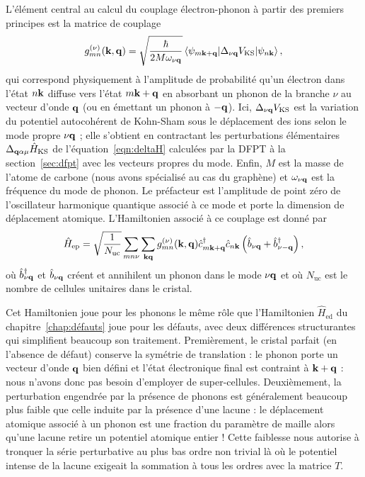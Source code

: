 L'élément central au calcul du couplage électron-phonon à partir des premiers principes est la matrice de couplage~\cite{giustinoElectronphononInteractionUsing2007}
\begin{equation}
    g_{mn}^{(\nu)}(\kv,\qv) = \sqrt{\frac{\hbar}{2M\omega_{\nu\qv}}}\matrixel{\psi_{m\kv+\qv}}{\Delta_{\nu\qv}V_\text{KS}}{\psi_{n\kv}},\label{eqn:g}
\end{equation}
qui correspond physiquement à l'amplitude de probabilité qu'un électron dans l'état $n\mathbf{k}$ diffuse vers l'état $m\mathbf{k}+\mathbf{q}$ en absorbant un phonon de la branche $\nu$ au vecteur d'onde $\mathbf{q}$ (ou en émettant un phonon à $-\mathbf{q}$). Ici, $\Delta_{\nu\mathbf{q}}V_\text{KS}$ est la variation du potentiel autocohérent de Kohn-Sham sous le déplacement des ions selon le mode propre $\nu\mathbf{q}$ ; elle s'obtient en contractant les perturbations élémentaires $\Delta_{\mathbf{q}\alpha\mu}\hat{H}_\text{KS}$ de l'équation~\eqref{eqn:deltaH} calculées par la DFPT à la section~\ref{sec:dfpt} avec les vecteurs propres du mode. Enfin, $M$ est la masse de l'atome de carbone (nous avons spécialisé au cas du graphène) et $\omega_{\nu\mathbf{q}}$ est la fréquence du mode de phonon. Le préfacteur est l'amplitude de point zéro de l'oscillateur harmonique quantique associé à ce mode et porte la dimension de déplacement atomique. L'Hamiltonien associé à ce couplage est donné par~\cite{giustinoElectronphononInteractionsFirst2017,ponceEPWElectronphononCoupling2016}
\begin{equation}
    \hat{H}_\text{ep}=\sqrt{\frac{1}{N_\text{uc}}}\sum_{mn\nu}\sum_{\mathbf{k}\mathbf{q}}g_{mn}^{(\nu)}(\mathbf{k},\mathbf{q})\hat{c}^\dag_{m\mathbf{k}+\mathbf{q}}\hat{c}_{n\mathbf{k}}\left(\hat{b}_{\nu\mathbf{q}}+\hat{b}^\dag_{\nu-\mathbf{q}}\right),\label{eqn:H_ep}
\end{equation}
où $\hat{b}^\dag_{\nu\mathbf{q}}$ et $\hat{b}_{\nu\mathbf{q}}$ créent et annihilent un phonon dans le mode $\nu\mathbf{q}$ et où $N_\text{uc}$ est le nombre de cellules unitaires dans le cristal.

Cet Hamiltonien joue pour les phonons le même rôle que l'Hamiltonien $\hat{H}_\text{ed}$ du chapitre~\ref{chap:défauts} joue pour les défauts, avec deux différences structurantes qui simplifient beaucoup son traitement. Premièrement, le cristal parfait (en l'absence de défaut) conserve la symétrie de translation : le phonon porte un vecteur d'onde $\mathbf{q}$ bien défini et l'état électronique final est contraint à $\mathbf{k}+\mathbf{q}$ : nous n'avons donc pas besoin d'employer de super-cellules. Deuxièmement, la perturbation engendrée par la présence de phonons est généralement beaucoup plus faible que celle induite par la présence d'une lacune : le déplacement atomique associé à un phonon est une fraction du paramètre de maille alors qu'une lacune retire un potentiel atomique entier ! Cette faiblesse nous autorise à tronquer la série perturbative au plus bas ordre non trivial là où le potentiel intense de la lacune exigeait la sommation à tous les ordres avec la matrice $T$.

